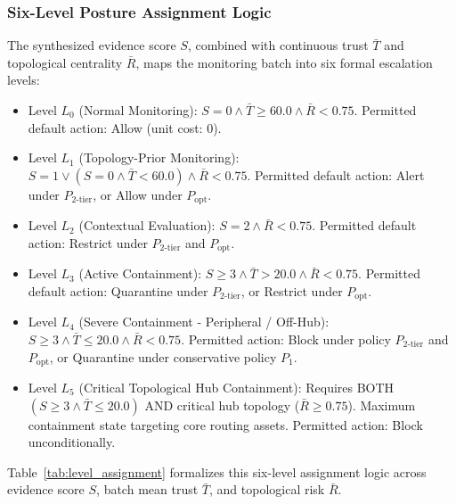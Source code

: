 \documentclass[journal,10pt,onecolumn]{IEEEtran}
\begin{document}
\subsubsection{Six-Level Posture Assignment Logic}
The synthesized evidence score $S$, combined with continuous trust $\bar{T}$ and topological centrality $\bar{R}$, maps the monitoring batch into six formal escalation levels:
\begin{itemize}
    \item Level $L_0$ (Normal Monitoring): $S = 0 \land \bar{T} \ge 60.0 \land \bar{R} < 0.75$. Permitted default action: Allow (unit cost: 0).
    \item Level $L_1$ (Topology-Prior Monitoring): $S = 1 \lor (S = 0 \land \bar{T} < 60.0) \land \bar{R} < 0.75$. Permitted default action: Alert under $P_{2\text{-tier}}$, or Allow under $P_{\text{opt}}$.
    \item Level $L_2$ (Contextual Evaluation): $S = 2 \land \bar{R} < 0.75$. Permitted default action: Restrict under $P_{2\text{-tier}}$ and $P_{\text{opt}}$.
    \item Level $L_3$ (Active Containment): $S \ge 3 \land \bar{T} > 20.0 \land \bar{R} < 0.75$. Permitted default action: Quarantine under $P_{2\text{-tier}}$, or Restrict under $P_{\text{opt}}$.
    \item Level $L_4$ (Severe Containment - Peripheral / Off-Hub): $S \ge 3 \land \bar{T} \le 20.0 \land \bar{R} < 0.75$. Permitted action: Block under policy $P_{2\text{-tier}}$ and $P_{\text{opt}}$, or Quarantine under conservative policy $P_1$.
    \item Level $L_5$ (Critical Topological Hub Containment): Requires BOTH $(S \ge 3 \land \bar{T} \le 20.0)$ AND critical hub topology ($\bar{R} \ge 0.75$). Maximum containment state targeting core routing assets. Permitted action: Block unconditionally.
\end{itemize}

Table~\ref{tab:level_assignment} formalizes this six-level assignment logic across evidence score $S$, batch mean trust $\bar{T}$, and topological risk $\bar{R}$.
\end{document}

